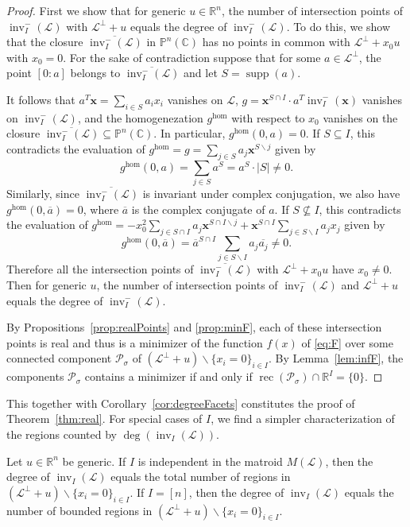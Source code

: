 \documentclass[ALCO,ThmDefs,Unicode,epreuves]{cedram}
\newcommand{\PP}{\mathbb{P}}
\newcommand{\R}{\mathbb{R}}
\newcommand{\Cbb}{\mathbb{C}}
\newcommand{\cL}{\mathcal{L}}
\newcommand{\cP}{\mathcal{P}}
\newcommand{\x}{\mathbf{x}}
\newcommand{\ol}{\overline}
\DeclareMathOperator{\inv}{inv}
\DeclareMathOperator{\supp}{supp}
\DeclareMathOperator{\rec}{rec}
\begin{document}
\begin{proof}
First we show that for generic $u\in \R^n$, the number of intersection points of $\inv_I^-(\cL)$ with $\cL^{\perp}+u$ equals the degree of $\inv_I^-(\cL)$. To do this, 
we show that the closure $\ol{\inv_I^-(\cL)}$ in $\PP^n(\Cbb)$ has no points in common with $\cL^{\perp}+x_0u$ with $x_0 = 0$. 
For the sake of contradiction suppose that for some $a\in \cL^{\perp}$, the point $[0: a]$ belongs to $\ol{\inv_I^-(\cL)}$ and let $S = \supp(a)$. 

It follows that $a^T\x = \sum_{i\in S}a_i x_i$ vanishes on $\cL$, $g = \x^{S\cap I}\cdot a^T\inv_I^-(\x)$ vanishes on $\inv_I^-(\cL)$, and the 
homogenezation $g^{\hom}$ with respect to $x_0$ vanishes on the closure $\ol{\inv_I^-(\cL)}\subseteq \PP^n(\Cbb)$. 
In particular, $g^{\hom} (0,a) =0$. If $S\subseteq I$, this contradicts the evaluation of $g^{\hom} = g = \sum_{j\in S}a_j \x^{S\backslash j}$ given by 
\[ g^{\hom}(0,a) = \sum_{j\in S}a^S = a^S\cdot |S| \neq 0.\]
Similarly, since $\ol{\inv_I^-(\cL)}$ is invariant under complex conjugation, we also have $g^{\hom} (0,\ol{a}) =0$, where $\ol{a}$ is the complex conjugate of $a$. 
If $S\not\subseteq I$, this contradicts the evaluation of 
$g^{\hom} = -x_0^2\sum_{j\in S\cap I}a_j \x^{S\cap I \backslash j} + \x^{S\cap I}\sum_{j\in S\backslash I}a_j x_j$ given by 
\[ g^{\hom}(0,\ol{a}) = \ol{a}^{S\cap I} \sum_{j\in S\backslash I}a_j \ol{a_j} \neq 0.\]
Therefore all the intersection points of $\ol{\inv_I^-(\cL)}$ with $\cL^{\perp}+x_0u$ have $x_0\neq 0$. 
Then for generic $u$, the number of intersection points of $\inv_I^-(\cL)$ and $\cL^{\perp}+u$ equals the degree of $\inv_I^-(\cL)$. 

By Propositions~\ref{prop:realPoints} and \ref{prop:minF}, each of these intersection points is real 
and thus is a minimizer of the function $f(x)$ of \eqref{eq:F} over some connected component $\cP_{\sigma}$ of $(\cL^{\perp}+u)\backslash\{x_i=0\}_{i\in I}$. 
By Lemma~\ref{lem:infF}, the components $\cP_{\sigma}$
contains a minimizer if and only if $\rec (\cP_{\sigma})\cap \R^{I}= \{0\}$.
\end{proof}

This together with Corollary~\ref{cor:degreeFacets} constitutes the proof of Theorem~\ref{thm:real}. 
For special cases of $I$, we find a simpler characterization of the regions counted by $\deg(\inv_I(\cL))$. 

\begin{coro} Let $u\in \R^n$ be generic. 
If $I$ is independent in the matroid $M(\cL)$, then the degree of $\inv_I(\cL)$ 
equals the total number of regions in ${(\cL^{\perp}+u)\backslash\{x_i=0\}_{i\in I}}$. 
If $I = [n]$, then the degree of $\inv_I(\cL)$ 
equals the number of bounded regions in ${(\cL^{\perp}+u)\backslash \{x_i=0\}_{i\in I}}$. 
\end{coro}
\end{document}
